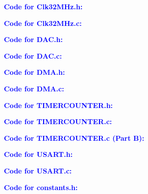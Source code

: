 \documentclass[11pt]{article}
\theoremstyle{plain}
\theoremstyle{definition}
\begin{document}
%
%
\newpage
%
%
\textbf{\textcolor{blue}{Code for Clk\textunderscore 32MHz.h:}}

\newpage
\textbf{\textcolor{blue}{Code for Clk\textunderscore 32MHz.c:}}

%
%
\newpage
\textbf{\textcolor{blue}{Code for DAC.h:}}

\newpage
\textbf{\textcolor{blue}{Code for DAC.c:}}

%
%
\newpage
\textbf{\textcolor{blue}{Code for DMA.h:}}

\newpage
\textbf{\textcolor{blue}{Code for DMA.c:}}

%
%
\newpage
\textbf{\textcolor{blue}{Code for TIMER\textunderscore COUNTER.h:}}

\newpage
\textbf{\textcolor{blue}{Code for TIMER\textunderscore COUNTER.c:}}

\newpage
\textbf{\textcolor{blue}{Code for TIMER\textunderscore COUNTER.c (Part B):}}

%
%
\newpage
\textbf{\textcolor{blue}{Code for USART.h:}}

\newpage
\textbf{\textcolor{blue}{Code for USART.c:}}

%
%
%
\newpage
\textbf{\textcolor{blue}{Code for constants.h:}}

\end{document}
